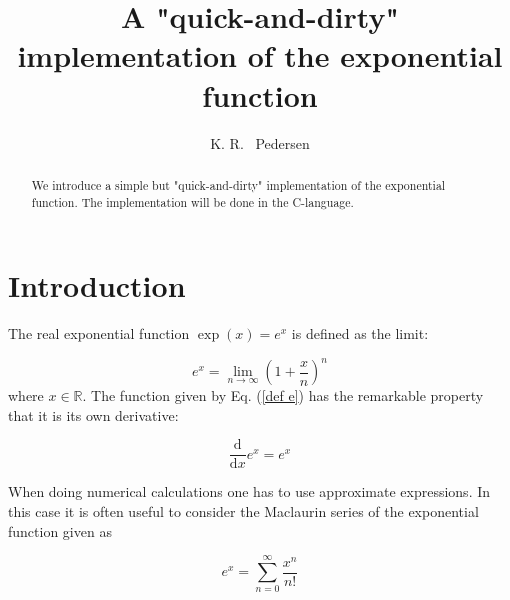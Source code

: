 \documentclass{article}
\title{A "quick-and-dirty" implementation of the exponential function}
\author{K. R. ~Pedersen}
\date{}
\begin{document}
\lstset{language=C}
\maketitle

\begin{abstract}
We introduce a simple but "quick-and-dirty" implementation of the exponential function. The implementation will be done in the C-language.
\end{abstract}

\section{Introduction}
The real exponential function $\exp(x)=e^x$ is defined as the limit:

\begin{equation}
e^x = \lim_{n \to \infty} \left(1+\frac{x}{n} \right)^n
\label{def e}
\end{equation}
where $x \in \mathbb{R}$. The function given by Eq. (\ref{def e}) has the remarkable property that it is its own derivative:

\begin{equation}
\frac{\mathrm d}{\mathrm d x} e^x = e^x
	\label{derivative}
\end{equation}

When doing numerical calculations one has to use approximate expressions. In this case it is often useful to consider the Maclaurin series of the exponential function given as

\begin{equation}
e^x=\sum_{n=0}^{\infty} \frac{x^n}{n!}
	\label{series}
\end{equation}
\end{document}
